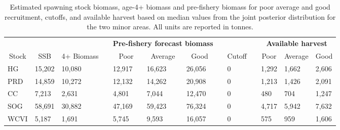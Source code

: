 %
\begin{table}[!tbp]
 \small
 \caption{Estimated spawning stock biomass,  age-4+ biomass and pre-fishery
			biomass for poor average and good recruitment,  cutoffs,  and 
			available harvest based on median values from the joint posterior distribution for the two minor areas.  All units are reported in tonnes.\label{TableCatchAdvice}} 
 \begin{center}
 \begin{tabular}{lllclllclclll}\hline\hline
\multicolumn{3}{c}{\bfseries }&
\multicolumn{1}{c}{\bfseries }&
\multicolumn{3}{c}{\bfseries Pre-fishery forecast biomass}&
\multicolumn{1}{c}{\bfseries }&
\multicolumn{1}{c}{\bfseries }&
\multicolumn{1}{c}{\bfseries }&
\multicolumn{3}{c}{\bfseries Available harvest}
\tabularnewline \cline{1-13}
\multicolumn{1}{c}{Stock}&\multicolumn{1}{c}{SSB}&\multicolumn{1}{c}{4+ Biomass}&\multicolumn{1}{c}{}&\multicolumn{1}{c}{Poor}&\multicolumn{1}{c}{Average}&\multicolumn{1}{c}{Good}&\multicolumn{1}{c}{}&\multicolumn{1}{c}{Cutoff}&\multicolumn{1}{c}{}&\multicolumn{1}{c}{Poor}&\multicolumn{1}{c}{Average}&\multicolumn{1}{c}{Good}\tabularnewline
\hline
HG&15,202&10,080&&12,917&16,623&26,056&&     0&& 1,292& 1,662& 2,606\tabularnewline
PRD&14,859&10,272&&12,132&14,262&20,908&&     0&& 1,213& 1,426& 2,091\tabularnewline
CC& 7,213& 2,631&& 4,801& 7,044&12,470&&     0&&   480&   704& 1,247\tabularnewline
SOG&58,691&30,882&&47,169&59,423&76,324&&     0&& 4,717& 5,942& 7,632\tabularnewline
WCVI& 5,187& 1,691&& 5,745& 9,593&16,057&&     0&&   575&   959& 1,606\tabularnewline
\hline
\end{tabular}

\end{center}

\end{table}

